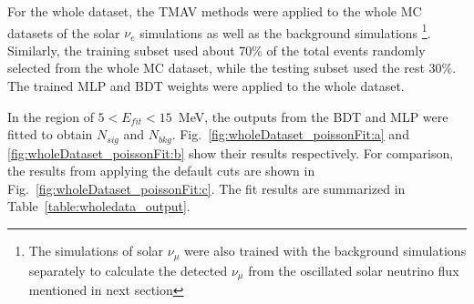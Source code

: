 For the whole dataset, the TMAV methods were applied to the whole MC datasets of the solar $\nu_e$ simulations as well as the background simulations \footnote{The simulations of solar $\nu_{\mu}$ were also trained with the background simulations separately to calculate the detected $\nu_\mu$ from the oscillated solar neutrino flux mentioned in next section}. Similarly, the training subset used about 70\% of the total events randomly selected from the whole MC dataset, while the testing subset used the rest 30\%. The trained MLP and BDT weights were applied to the whole dataset.

In the region of $5<E_{fit}<15$~MeV, the outputs from the BDT and MLP were fitted to obtain $N_{sig}$ and $N_{bkg}$. Fig.~\ref{fig:wholeDataset_poissonFit:a} and \ref{fig:wholeDataset_poissonFit:b} show their results respectively. For comparison, the results from applying the default cuts are shown in Fig.~\ref{fig:wholeDataset_poissonFit:c}. The fit results are summarized in Table~\ref{table:wholedata_output}. 

